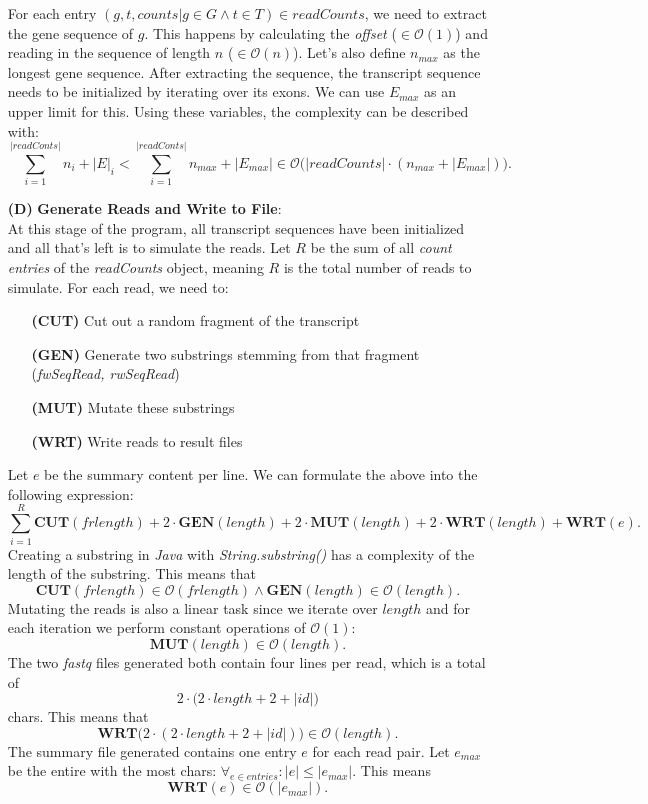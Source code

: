 \documentclass[12pt]{article}
\begin{document}
\begin{enumerate}
		For each entry $(g, t, counts | g \in G \land t \in T) \in readCounts$, we need to extract the gene sequence of $g$.
		This happens by calculating the \textit{offset} ($\in \mathcal{O}(1)$) and reading in the sequence of length $n$ ($\in \mathcal{O}(n)$).
		Let's also define $n_{max}$ as the longest gene sequence.
		After extracting the sequence, the transcript sequence needs to be initialized by iterating over its exons.
		We can use $E_{max}$ as an upper limit for this.
		Using these variables, the complexity can be described with:
		\[
			\sum_{i=1}^{|readConts|} n_{i} + |E|_{i} < \sum_{i=1}^{|readConts|} n_{max} + |E_{max}| \in \mathcal{O}\Big(|readCounts| \cdot (n_{max} + |E_{max}|)\Big)
			.\]
	\item[\textbf{(D)}] \textbf{Generate Reads and Write to File}:\\
		At this stage of the program, all transcript sequences have been initialized and all that's left is to simulate the reads.
		Let $R$ be the sum of all \textit{count entries} of the \textit{readCounts} object, meaning $R$ is the total number of reads to
		simulate. For each read, we need to:
		\begin{enumerate}
			\item[\textbf{(CUT)}] Cut out a random fragment of the transcript
			\item[\textbf{(GEN)}] Generate two substrings stemming from that fragment (\textit{fwSeqRead, rwSeqRead})
			\item[\textbf{(MUT)}] Mutate these substrings
			\item[\textbf{(WRT)}] Write reads to result files
		\end{enumerate}
		Let $e$ be the summary content per line. We can formulate the above into the following expression:
		\[
			\sum_{i=1}^{R} \mathbf{CUT}(frlength) + 2 \cdot \mathbf{GEN}(length) + 2 \cdot \mathbf{MUT}(length) + 2 \cdot \mathbf{WRT}(length) + \mathbf{WRT}(e)
			.\]
		Creating a substring in \textit{Java} with \textit{String.substring()} has a complexity of the length of the substring.
		This means that
		\[
			\mathbf{CUT}(frlength) \in \mathcal{O}(frlength) \land \mathbf{GEN}(length) \in \mathcal{O}(length)
			.\]
		Mutating the reads is also a linear task since we iterate over $length$ and for each iteration we perform
		constant operations of $\mathcal{O}(1)$:
		\[
			\mathbf{MUT}(length) \in \mathcal{O}(length)
			.\]
		The two \textit{fastq} files generated both contain four lines per read, which is a total of
		\[
			2 \cdot \big(2 \cdot length + 2 + |id|\big)
		\]
		chars. This means that
		\[
			\mathbf{WRT}\big(2 \cdot (2 \cdot length + 2 + |id|)\big) \in \mathcal{O}(length)
			.\]
		The summary file generated contains one entry $e$ for each read pair. Let $e_{max}$ be the entire with the most chars: $\forall_{e \in entries}: |e| \le |e_{max}|$.
		This means
		\[
			\mathbf{WRT}(e) \in \mathcal{O}(|e_{max}|)
			.\]


\end{enumerate}
\end{document}
